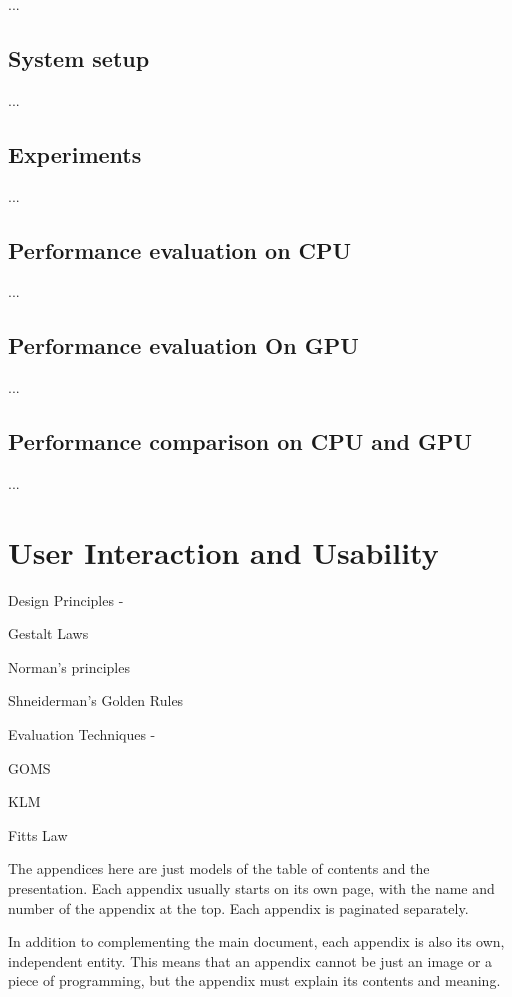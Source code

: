 \documentclass[english]{tktltiki}
\begin{document}
...


\subsection{System setup}

...


\subsection{Experiments}

...


\subsection{Performance evaluation on CPU}

...

\subsection{Performance evaluation On GPU}

...

\subsection{Performance comparison on CPU and GPU}

...


\section{User Interaction and Usability}

Design Principles -

Gestalt Laws

Norman's principles

Shneiderman's Golden Rules

Evaluation Techniques -

GOMS

KLM

Fitts Law




\nocite{*}



\lastpage

\appendices

\pagestyle{empty}


The appendices here are just models of the table of contents and the presentation. Each appendix 
usually starts on its own page, with the name and number of the appendix at the top. Each appendix is paginated separately.

In addition to complementing the main document, each appendix is also its own, independent entity. 
This means that an appendix cannot be just an image or a piece of programming, but the appendix must explain its contents and meaning.
\end{document}

